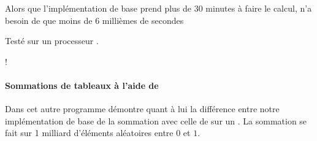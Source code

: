 \documentclass[letterpaper,10pt,french]{sphinxmanual}
\begin{document}
\begin{sphinxVerbatim}[commandchars=\\\{\}]
     
     
\end{sphinxVerbatim}

Alors que l’implémentation de base prend plus de 30 minutes à faire le calcul,  n’a besoin de que moins de 6 millièmes de secondes%
\begin{footnote}[30]\sphinxAtStartFootnote
Testé sur un processeur .
%
\end{footnote}!


\paragraph{Sommations de tableaux à l’aide de }
\label{\detokenize{preprocessing:sommations-de-tableaux-a-laide-de-numpy}}
Dans cet autre programme démontre quant à lui la différence entre notre implémentation de base de la sommation avec celle de  sur un . La sommation se fait sur 1 milliard d’éléments aléatoires entre \(0\) et \(1\).
\end{document}

